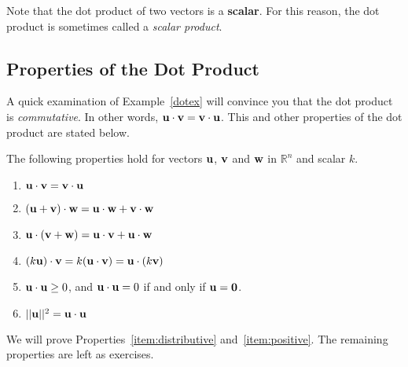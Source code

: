 \documentclass{ximera}
\renewcommand{\vec}[1]{{\bf #1}}
\newcommand{\RR}{\mathbb{R}}
\newcommand{\dfn}{\textit}
\newcommand{\dotp}{\cdot}
\begin{document}
Note that the dot product of two vectors is a {\bf scalar}.  For this reason, the dot product is sometimes called a \dfn{scalar product}.

\subsection*{Properties of the Dot Product}

A quick examination of Example~\ref{dotex} will convince you that the dot product is \dfn{commutative}. In other words, $\vec{u}\dotp\vec{v}=\vec{v}\dotp\vec{u}$.  This and other properties of the dot product are stated below.

\begin{theorem}\label{dottheorem} The following properties hold for
  vectors $\vec{u}$, $\vec{v}$ and $\vec{w}$ in $\RR^n$ and scalar
  $k$.
  \begin{enumerate}
  \item\label{item:commutative}
    $\vec{u}\dotp\vec{v}=\vec{v}\dotp\vec{u}$
   
  \item\label{item:distributive} $(\vec{u}+\vec{v})\dotp \vec{w}=\vec{u}\dotp \vec{w}+\vec{v}\dotp \vec{w}$
   
  \item\label{item:distributive-again} $\vec{u}\dotp (\vec{v}+\vec{w})=\vec{u}\dotp\vec{v}+\vec{u}\dotp \vec{w}$
   
  \item\label{item:scalar} $(k\vec{u})\dotp \vec{v}=k(\vec{u}\dotp\vec{v})=\vec{u}\dotp (k\vec{v})$
   
  \item \label{item:positive} $\vec{u}\dotp\vec{u}\geq 0$, and $\vec{u}\dotp\vec{u}=0$ if and only if $\vec{u}={\bf 0}$.
   
  \item \label{item:norm}
    $||\vec{u}||^2=\vec{u}\dotp\vec{u}$
  \end{enumerate}
\end{theorem}

We will prove Properties~\ref{item:distributive}
and~\ref{item:positive}.  The remaining properties are left as exercises.
\end{document}
